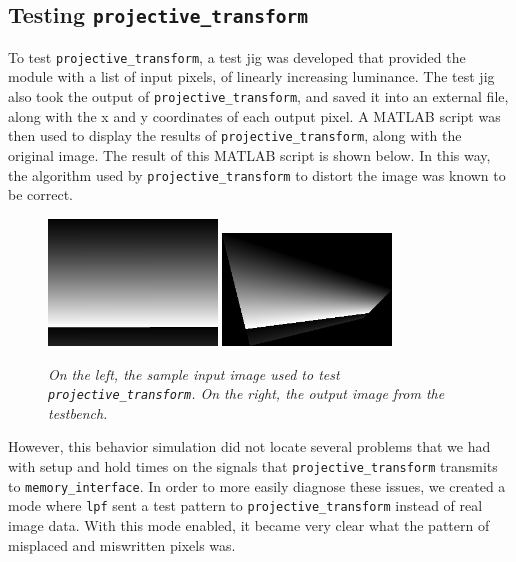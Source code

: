\documentclass[10pt]{article}
\begin{document}
{\subsection{Testing {\tt projective\_transform}}

To test {\tt projective\_transform}, a test jig was developed that provided the module with a list of input pixels, of linearly increasing luminance. The test jig also took the output of {\tt projective\_transform}, and saved it into an external file, along with the x and y coordinates of each output pixel. A MATLAB script was then used to display the results of {\tt projective\_transform}, along with the original image. The result of this MATLAB script is shown below. In this way, the algorithm used by {\tt projective\_transform} to distort the image was known to be correct.

\begin{figure}[h!]
\centering
\includegraphics[width=0.4\textwidth]{images/original.png}
\includegraphics[width=0.4\textwidth]{images/output.png}
\caption{\emph{On the left, the sample input image used to test {\tt projective\_transform}. On the right, the output image from the testbench.}}
\end{figure}

However, this behavior simulation did not locate several problems that we had with setup and hold times on the signals that {\tt projective\_transform} transmits to {\tt memory\_interface}. In order to more easily diagnose these issues, we created a mode where {\tt lpf} sent a test pattern to {\tt projective\_transform} instead of real image data. With this mode enabled, it became very clear what the pattern of misplaced and miswritten pixels was.

}
\end{document}
